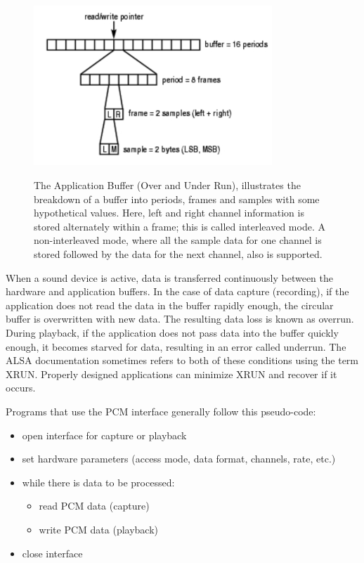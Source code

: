 \documentclass{article}
\begin{document}
\begin{figure}[!hb]
    \begin{minipage}[b]{0.49\textwidth}
    	\centering
		\includegraphics[width=0.8\textwidth]{IMG/ALSA.PNG}   	
	\end{minipage}
    \hfill
    \begin{minipage}[b]{0.49\textwidth}
		The Application Buffer (Over and Under Run), illustrates the breakdown of a buffer into periods, frames and samples with some hypothetical values. Here, left and right channel information is stored alternately within a frame; this is called interleaved mode. A non-interleaved mode, where all the sample data for one channel is stored followed by the data for the next channel, also is supported.\vspace{12pt} 	
	\end{minipage}
\end{figure}





When a sound device is active, data is transferred continuously between the hardware and application buffers. In the case of data capture (recording), if the application does not read the data in the buffer rapidly enough, the circular buffer is overwritten with new data. The resulting data loss is known as overrun. During playback, if the application does not pass data into the buffer quickly enough, it becomes starved for data, resulting in an error called underrun. The ALSA documentation sometimes refers to both of these conditions using the term XRUN. Properly designed applications can minimize XRUN and recover if it occurs.

\noindent Programs that use the PCM interface generally follow this pseudo-code:
\begin{itemize}
	\item open interface for capture or playback
	\item set hardware parameters (access mode, data format, channels, rate, etc.)
	\item while there is data to be processed:
	\begin{itemize}
		\item read PCM data (capture)
		\item write PCM data (playback)
	\end{itemize}
	\item close interface
\end{itemize}
	
\end{document}
